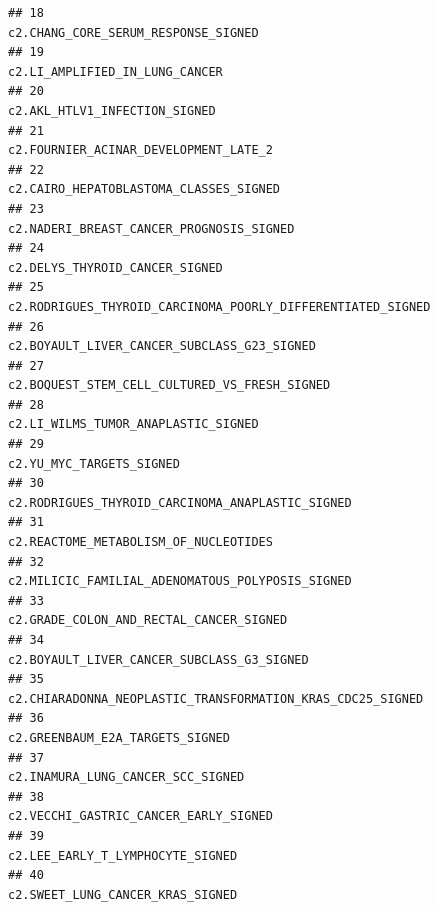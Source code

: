 \documentclass{article}\usepackage[]{graphicx}\usepackage[]{color}
\makeatletter
\newenvironment{kframe}{%
 \def\at@end@of@kframe{}%
 \ifinner\ifhmode%
  \def\at@end@of@kframe{\end{minipage}}%
  \begin{minipage}{\columnwidth}%
 \fi\fi%
 \def\FrameCommand##1{\hskip\@totalleftmargin \hskip-\fboxsep
 \colorbox{shadecolor}{##1}\hskip-\fboxsep
     \hskip-\linewidth \hskip-\@totalleftmargin \hskip\columnwidth}%
 \MakeFramed {\advance\hsize-\width
   \@totalleftmargin\z@ \linewidth\hsize
   \@setminipage}}%
 {\par\unskip\endMakeFramed%
 \at@end@of@kframe}
\newenvironment{knitrout}{}{} %
\makeatother
\begin{document}
\begin{knitrout}
\begin{kframe}
\begin{verbatim}
## 18                                                                         c2.CHANG_CORE_SERUM_RESPONSE_SIGNED
## 19                                                                              c2.LI_AMPLIFIED_IN_LUNG_CANCER
## 20                                                                               c2.AKL_HTLV1_INFECTION_SIGNED
## 21                                                                       c2.FOURNIER_ACINAR_DEVELOPMENT_LATE_2
## 22                                                                      c2.CAIRO_HEPATOBLASTOMA_CLASSES_SIGNED
## 23                                                                    c2.NADERI_BREAST_CANCER_PROGNOSIS_SIGNED
## 24                                                                              c2.DELYS_THYROID_CANCER_SIGNED
## 25                                                 c2.RODRIGUES_THYROID_CARCINOMA_POORLY_DIFFERENTIATED_SIGNED
## 26                                                                 c2.BOYAULT_LIVER_CANCER_SUBCLASS_G23_SIGNED
## 27                                                               c2.BOQUEST_STEM_CELL_CULTURED_VS_FRESH_SIGNED
## 28                                                                         c2.LI_WILMS_TUMOR_ANAPLASTIC_SIGNED
## 29                                                                                    c2.YU_MYC_TARGETS_SIGNED
## 30                                                            c2.RODRIGUES_THYROID_CARCINOMA_ANAPLASTIC_SIGNED
## 31                                                                       c2.REACTOME_METABOLISM_OF_NUCLEOTIDES
## 32                                                            c2.MILICIC_FAMILIAL_ADENOMATOUS_POLYPOSIS_SIGNED
## 33                                                                     c2.GRADE_COLON_AND_RECTAL_CANCER_SIGNED
## 34                                                                  c2.BOYAULT_LIVER_CANCER_SUBCLASS_G3_SIGNED
## 35                                                  c2.CHIARADONNA_NEOPLASTIC_TRANSFORMATION_KRAS_CDC25_SIGNED
## 36                                                                             c2.GREENBAUM_E2A_TARGETS_SIGNED
## 37                                                                           c2.INAMURA_LUNG_CANCER_SCC_SIGNED
## 38                                                                       c2.VECCHI_GASTRIC_CANCER_EARLY_SIGNED
## 39                                                                            c2.LEE_EARLY_T_LYMPHOCYTE_SIGNED
## 40                                                                            c2.SWEET_LUNG_CANCER_KRAS_SIGNED

\end{verbatim}
\end{kframe}
\end{knitrout}
\end{document}

